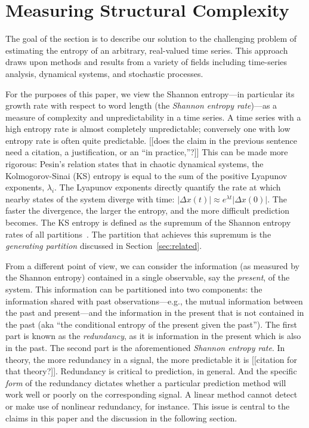 \section{Measuring Structural Complexity }\label{sec:meaComplex}

The goal of the section is to describe our solution to the challenging
problem of estimating the entropy of an arbitrary, real-valued time
series.  This approach draws upon methods and results from a variety
of fields including time-series analysis, dynamical systems, and
stochastic processes.

For the purposes of this paper, we view the Shannon entropy---in
particular its growth rate with respect to word length (the
\emph{Shannon entropy rate})---as a measure of complexity and
unpredictability in a time series.  A time series with a high entropy
rate is almost completely unpredictable; conversely one with low
entropy rate is often quite predictable. {\color{red} [[does the claim
      in the previous sentence need a citation, a justification, or an
      ``in practice,''?]]}  This can be made more rigorous: Pesin's
relation \cite{pesin77} states that in chaotic dynamical systems, the
Kolmogorov-Sinai (KS) entropy is equal to the sum of the positive
Lyapunov exponents, $\lambda_i$.  The Lyapunov exponents directly
quantify the rate at which nearby states of the system diverge with
time: $\left| \Delta x(t) \right| \approx e^{\lambda t} \left| \Delta
x(0) \right|$.  The faster the divergence, the larger the entropy, and
the more difficult prediction becomes.  The KS entropy is defined as
the supremum of the Shannon entropy rates of all
partitions~\cite{petersen1989}. The partition that achieves this
supremum is the \emph{generating partition} discussed in
Section~\ref{sec:related}.

From a different point of view, we can consider the information (as
measured by the Shannon entropy) contained in a single observable, say
the \emph{present}, of the system. This information can be partitioned
into two components: the information shared with past
observations---e.g., the mutual information between the past and
present---and the information in the present that is not contained in
the past (aka ``the conditional entropy of the present given the
past'').  The first part is known as the \emph{redundancy}, as it is
information in the present which is also in the past.  The second part
is the aforementioned \emph{Shannon entropy rate}.  In theory, the
more redundancy in a signal, the more predictable it is {\color{red}
  [[citation for that theory?]]}.  Redundancy is critical to
prediction, in general.  And the specific \emph{form} of the
redundancy dictates whether a particular prediction method will work
well or poorly on the corresponding signal.  A linear method cannot
detect or make use of nonlinear redundancy, for instance.  This issue
is central to the claims in this paper and the discussion in the
following section.

